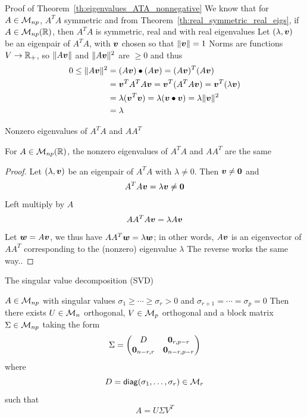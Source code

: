\documentclass[aspectratio=169]{beamer}\usepackage[]{graphicx}\usepackage[]{xcolor}
\begin{document}
\begin{frame}[importantcolour]{Proof of Theorem~\ref{th:eigenvalues_ATA_nonnegative}}
We know that for $A\in\mathcal{M}_{np}$, $A^TA$ symmetric and from Theorem~\ref{th:real_symmetric_real_eigs}, if $A\in\mathcal{M}_{np}(\mathbb{R})$, then $A^TA$ is symmetric, real and with real eigenvalues
\vfill
Let $(\lambda,\bm{v})$ be an eigenpair of $A^TA$, with $\bm{v}$ chosen so that $\|\bm{v}\|=1$
\vfill 
Norms are functions $V\to\mathbb{R}_+$, so $\|A\bm{v}\|$ and $\|A\bm{v}\|^2$ are $\geq 0$ and thus
\begin{align*}
0\leq \|A\bv\|^2 &= (A\bv)\bullet(A\bv) = (A\bv)^T(A\bv) \\
&= \bv^TA^TA\bv = \bv^T(A^TA\bv) = \bv^T(\lambda\bv) \\
&= \lambda(\bv^T\bv) = \lambda(\bv\bullet\bv) = \lambda\|\bv\|^2 \\
&= \lambda\hfill\qedhere
\end{align*}
\end{frame}

\begin{frame}{Nonzero eigenvalues of $A^TA$ and $AA^T$}
\begin{theorem}
For $A\in\mathcal{M}_{np}(\mathbb{R})$, the nonzero eigenvalues of $A^TA$ and $AA^T$ are the same
\end{theorem}
\vfill
\begin{proof}
Let $(\lambda,\bm{v})$ be an eigenpair of $A^TA$ with $\lambda\neq 0$. Then $\bv\neq\b0$ and
\[
	A^TA\bv=\lambda\bv\neq\b0
\]
Left multiply by $A$
\[
	AA^TA\bm{v} = \lambda A\bm{v}
\]
Let $\bm{w}=A\bm{v}$, we thus have $AA^T\bm{w}=\lambda\bm{w}$; in other words, $A\bm{v}$ is an eigenvector of $AA^T$ corresponding to the (nonzero) eigenvalue $\lambda$
\vfill
The reverse works the same way..
\end{proof}
\end{frame}


\begin{frame}{The singular value decomposition (SVD)}
\begin{importanttheorem}[SVD]\label{th:SVD}
$A\in\mathcal{M}_{np}$ with singular values $\sigma_1\geq\cdots\geq\sigma_r>0$ and $\sigma_{r+1}=\cdots=\sigma_p=0$
\vskip0.5cm
Then there exists $U\in\mathcal{M}_n$ orthogonal, $V\in\mathcal{M}_p$ orthogonal and a block matrix $\Sigma\in\mathcal{M}_{np}$ taking the form
\[
\Sigma=
\begin{pmatrix}
D & \b0_{r, p-r} \\
\b0_{n-r, r} & \b0_{n-r, p-r}
\end{pmatrix}
\]
where 
\[
D = \mathsf{diag}(\sigma_1,\ldots,\sigma_r)\in\mathcal{M}_r
\] 
such that
\[
A=U\Sigma V^T
\]
\end{importanttheorem}
\end{frame}
\end{document}
